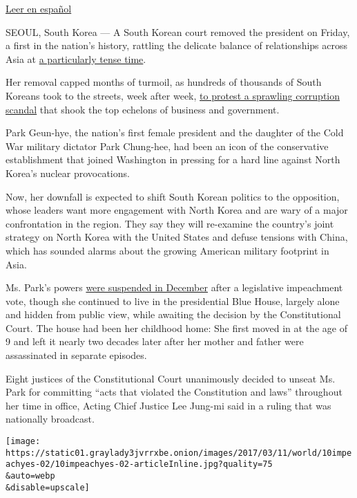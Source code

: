 \href{https://www.nytimes3xbfgragh.onion/es/2017/03/10/corea-del-sur-destituye-a-su-presidenta-y-se-reconfigura-el-panorama-politico-en-asia/}{Leer
en español}

SEOUL, South Korea --- A South Korean court removed the president on
Friday, a first in the nation's history, rattling the delicate balance
of relationships across Asia at
\href{https://www.nytimes3xbfgragh.onion/2017/03/07/world/asia/thaad-missile-defense-us-south-korea-china.html}{a
particularly tense time}.

Her removal capped months of turmoil, as hundreds of thousands of South
Koreans took to the streets, week after week,
\href{https://www.nytimes3xbfgragh.onion/2016/11/26/world/asia/korea-park-geun-hye-protests.html}{to
protest a sprawling corruption scandal} that shook the top echelons of
business and government.

Park Geun-hye, the nation's first female president and the daughter of
the Cold War military dictator Park Chung-hee, had been an icon of the
conservative establishment that joined Washington in pressing for a hard
line against North Korea's nuclear provocations.

Now, her downfall is expected to shift South Korean politics to the
opposition, whose leaders want more engagement with North Korea and are
wary of a major confrontation in the region. They say they will
re-examine the country's joint strategy on North Korea with the United
States and defuse tensions with China, which has sounded alarms about
the growing American military footprint in Asia.

Ms. Park's powers
\href{https://www.nytimes3xbfgragh.onion/2016/12/09/world/asia/south-korea-president-park-geun-hye-impeached.html}{were
suspended in December} after a legislative impeachment vote, though she
continued to live in the presidential Blue House, largely alone and
hidden from public view, while awaiting the decision by the
Constitutional Court. The house had been her childhood home: She first
moved in at the age of 9 and left it nearly two decades later after her
mother and father were assassinated in separate episodes.

Eight justices of the Constitutional Court unanimously decided to unseat
Ms. Park for committing ``acts that violated the Constitution and laws''
throughout her time in office, Acting Chief Justice Lee Jung-mi said in
a ruling that was nationally broadcast.

\texttt{[image: https://static01.graylady3jvrrxbe.onion/images/2017/03/11/world/10impeachyes-02/10impeachyes-02-articleInline.jpg?quality=75\\\&auto=webp\\\&disable=upscale]}

